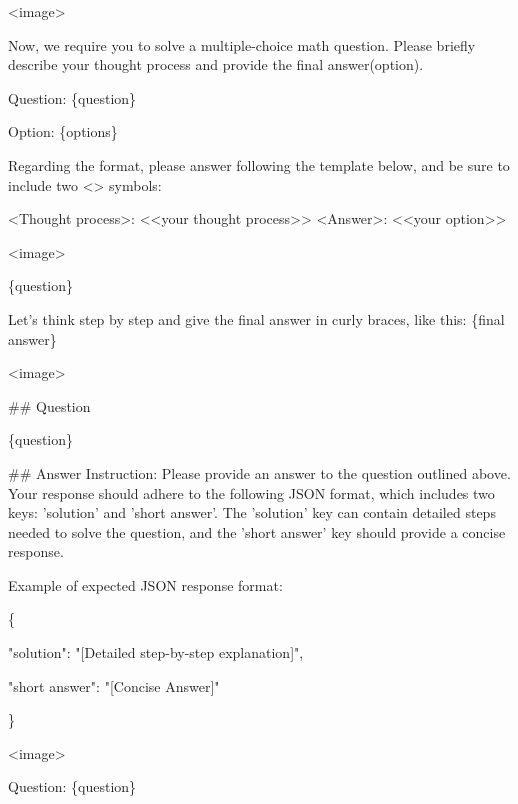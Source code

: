 \begin{tcolorbox}[
  title=We-Math,
  fonttitle=\bfseries,
  colframe=black,
  colback=white,
  toptitle=1mm,
  bottomtitle=1mm,
  top=2mm,
  verbatim,
]
<image>

Now, we require you to solve a multiple-choice math question. Please briefly describe your thought process and provide the final answer(option).

Question: \{question\}

Option: \{options\}

Regarding the format, please answer following the template below, and be sure to include two <> symbols:

<Thought process>: <<your thought process>> <Answer>: <<your option>>
\end{tcolorbox}

\begin{tcolorbox}[
  title=ZeroBench,
  fonttitle=\bfseries,
  colframe=black,
  colback=white,
  toptitle=1mm,
  bottomtitle=1mm,
  top=2mm,
  verbatim,
]
<image>

\{question\}

Let's think step by step and give the final answer in curly braces, like this: \{final answer\}
\end{tcolorbox}

\begin{tcolorbox}[
  title=DynaMath,
  fonttitle=\bfseries,
  colframe=black,
  colback=white,
  toptitle=1mm,
  bottomtitle=1mm,
  top=2mm,
  verbatim,
]
<image>

\#\# Question

\{question\}

\#\# Answer Instruction: Please provide an answer to the question outlined above. Your response should adhere to the following JSON format, which includes two keys: 'solution' and 'short answer'. The 'solution' key can contain detailed steps needed to solve the question, and the 'short answer' key should provide a concise response. 


Example of expected JSON response format:

\{

    "solution": "[Detailed step-by-step explanation]",
    
    "short answer": "[Concise Answer]"
    
\}
\end{tcolorbox}

\begin{tcolorbox}[
  title=VLMBlind,
  fonttitle=\bfseries,
  colframe=black,
  colback=white,
  toptitle=1mm,
  bottomtitle=1mm,
  top=2mm,
  verbatim,
]
<image>

Question: \{question\}
\end{tcolorbox}

